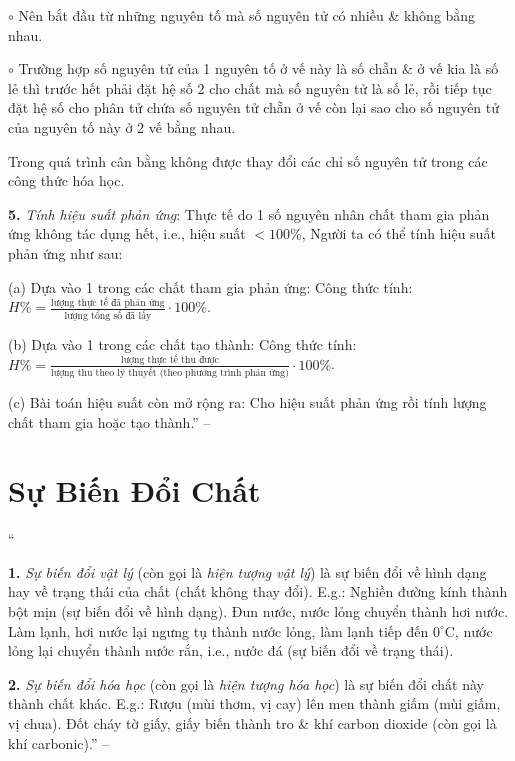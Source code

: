 \documentclass{article}
\numberwithin{equation}{section}
\begin{document}
\begin{enumerate*}
\begin{enumerate*}
\begin{enumerate*}
			\item[$\circ$] Nên bắt đầu từ những nguyên tố mà số nguyên tử có nhiều \& không bằng nhau.
			\item[$\circ$] Trường hợp số nguyên tử của 1 nguyên tố ở vế này là số chẵn \& ở vế kia là số lẻ thì trước hết phải đặt hệ số $2$ cho chất mà số nguyên tử là số lẻ, rồi tiếp tục đặt hệ số cho phân tử chứa số nguyên tử chẵn ở vế còn lại sao cho số nguyên tử của nguyên tố này ở 2 vế bằng nhau.
		\end{enumerate*}
	\end{enumerate*}
	Trong quá trình cân bằng không được thay đổi các chỉ số nguyên tử trong các công thức hóa học.
	\item[\textbf{5.}] \textit{Tính hiệu suất phản ứng}: Thực tế do 1 số nguyên nhân chất tham gia phản ứng không tác dụng hết, i.e., hiệu suất $< 100$\%, Người ta có thể tính hiệu suất phản ứng như sau:
	\begin{enumerate*}
		\item[(a)] Dựa vào 1 trong các chất tham gia phản ứng: Công thức tính: $H\% = \frac{\mbox{lượng thực tế đã phản ứng}}{\mbox{lượng tổng số đã lấy}}\cdot100\%$.
		\item[(b)] Dựa vào 1 trong các chất tạo thành: Công thức tính: $H\% = \frac{\mbox{lượng thực tế thu được}}{\mbox{lượng thu theo lý thuyết (theo phương trình phản ứng)}}\cdot100\%$.
		\item[(c)] Bài toán hiệu suất còn mở rộng ra: Cho hiệu suất phản ứng rồi tính lượng chất tham gia hoặc tạo thành.'' -- \cite[Chap. 2, pp. 44--46]{An_400_BT_Hoa_Hoc_8_2020}
	\end{enumerate*}
\end{enumerate*}

\section{Sự Biến Đổi Chất}
``\begin{enumerate*}
	\item[\textbf{1.}] \textit{Sự biến đổi vật lý} (còn gọi là \textit{hiện tượng vật lý}) là sự biến đổi về hình dạng hay về trạng thái của chất (chất không thay đổi). E.g.: Nghiền đường kính thành bột mịn (sự biến đổi về hình dạng). Đun nước, nước lỏng chuyển thành hơi nước. Làm lạnh, hơi nước lại ngưng tụ thành nước lỏng, làm lạnh tiếp đến $0^\circ$C, nước lỏng lại chuyển thành nước rắn, i.e., nước đá (sự biến đổi về trạng thái).
	\item[\textbf{2.}] \textit{Sự biến đổi hóa học} (còn gọi là \textit{hiện tượng hóa học}) là sự biến đổi chất này thành chất khác. E.g.: Rượu (mùi thơm, vị cay) lên men thành giấm (mùi giấm, vị chua). Đốt cháy tờ giấy, giấy biến thành tro \& khí carbon dioxide  (còn gọi là khí carbonic).'' -- \cite[Chap. 2, p. 32]{Truong_BTNC_Hoa_Hoc_8_2022}
\end{enumerate*}
\end{document}
